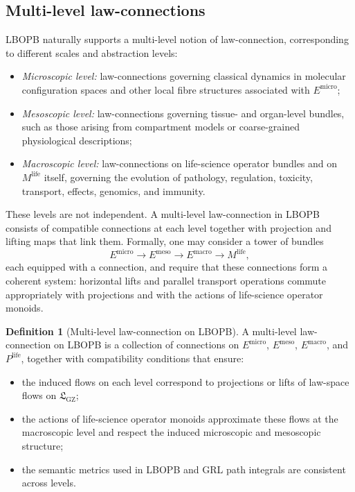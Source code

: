 \documentclass[11pt]{book}
\theoremstyle{plain}
\theoremstyle{definition}
\newtheorem{definition}[theorem]{Definition}
\theoremstyle{remark}
\newcommand{\GZLS}{\ensuremath{\mathfrak{L}_{\mathrm{GZ}}}}       \newcommand{\GZLT}{\ensuremath{M_{!w}}}                           \newcommand{\GZLOC}{\ensuremath{A_M}}                             \newcommand{\GZLCurv}{\ensuremath{\mathcal{F}_{\mathrm{law}}}}
\begin{document}
\subsection*{Multi-level law-connections}

LBOPB naturally supports a multi-level notion of law-connection,
corresponding to different scales and abstraction levels:

\begin{itemize}
  \item \emph{Microscopic level:} law-connections governing classical
        dynamics in molecular configuration spaces and other local
        fibre structures associated with $E^{\mathrm{micro}}$;
  \item \emph{Mesoscopic level:} law-connections governing tissue- and
        organ-level bundles, such as those arising from compartment
        models or coarse-grained physiological descriptions;
  \item \emph{Macroscopic level:} law-connections on life-science
        operator bundles and on $M^{\mathrm{life}}$ itself, governing
        the evolution of pathology, regulation, toxicity, transport,
        effects, genomics, and immunity.
\end{itemize}

These levels are not independent. A multi-level law-connection in
LBOPB consists of compatible connections at each level together with
projection and lifting maps that link them. Formally, one may consider
a tower of bundles
\[
  E^{\mathrm{micro}} \to E^{\mathrm{meso}} \to E^{\mathrm{macro}}
  \to M^{\mathrm{life}},
\]
each equipped with a connection, and require that these connections
form a coherent system: horizontal lifts and parallel transport
operations commute appropriately with projections and with the
actions of life-science operator monoids.

\begin{definition}[Multi-level law-connection on LBOPB]
A multi-level law-connection on LBOPB is a collection of connections
on $E^{\mathrm{micro}}$, $E^{\mathrm{meso}}$, $E^{\mathrm{macro}}$,
and $P^{\mathrm{life}}$, together with compatibility conditions that
ensure:
\begin{itemize}
  \item the induced flows on each level correspond to projections or
        lifts of law-space flows on $\GZLS$;
  \item the actions of life-science operator monoids approximate these
        flows at the macroscopic level and respect the induced
        microscopic and mesoscopic structure;
  \item the semantic metrics used in LBOPB and GRL path integrals are
        consistent across levels.
\end{itemize}
\end{definition}
\end{document}
